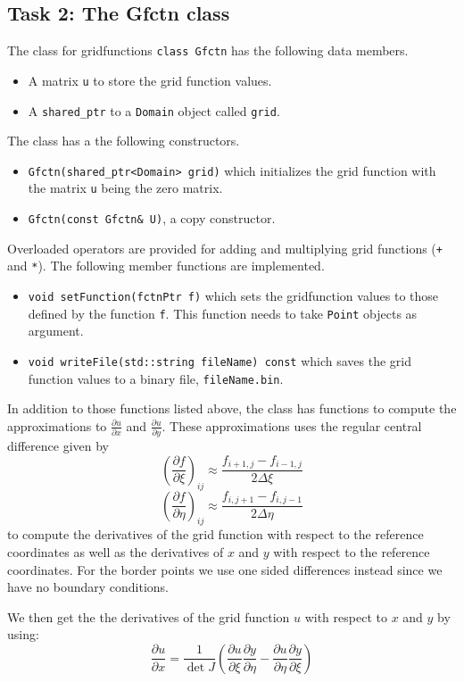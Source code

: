 \documentclass[a4paper,10pt]{article}
\begin{document}
\subsection*{Task 2: The Gfctn class}
The class for gridfunctions \texttt{class Gfctn} has the following data members.
\begin{itemize}
  \item
    A matrix \texttt{u} to store the grid function values.
  \item
    A \texttt{shared\_ptr} to a \texttt{Domain} object called \texttt{grid}.
\end{itemize}
The class has a the following constructors.
\begin{itemize}
  \item \texttt{Gfctn(shared\_ptr<Domain> grid)} which initializes the grid function with
    the matrix \texttt{u} being the zero matrix.
  \item \texttt{Gfctn(const Gfctn\& U)}, a copy constructor.
\end{itemize}
Overloaded operators are provided for adding and multiplying grid functions (\texttt{+} and 
\texttt{*}).
The following member functions are implemented.
\begin{itemize}
  \item
    \texttt{void setFunction(fctnPtr f)} which sets the gridfunction values to those
    defined by the function \texttt{f}. This function needs to take \texttt{Point}
    objects as argument.
  \item
    \texttt{void writeFile(std::string fileName) const} which saves the grid function
    values to a binary file, \texttt{fileName.bin}.
\end{itemize}
In addition to those functions listed above, the class has functions to compute 
the approximations to $\tfrac{\partial u}{\partial x}$ and $\tfrac{\partial u}{\partial y}$. These approximations uses the regular central difference given by
$$\left( \frac{\partial f}{\partial \xi} \right)_{ij} \approx \frac{f_{i+1,j}-f_{i-1,j}}{2 \Delta \xi} $$ 
$$\left(\frac{\partial f}{\partial \eta}\right)_{ij} \approx \frac{f_{i,j+1}-f_{i,j-1}}{2 \Delta \eta} $$ 
to compute the derivatives of the grid function with respect to the reference coordinates as well as the derivatives of $x$ and $y$ with respect to the reference coordinates. For the border points we use one sided differences instead since we have no boundary conditions.

We then get the the derivatives of the grid function $u$ with respect to $x$ and $y$ by using:
$$\frac{\partial u}{\partial x} = \frac{1}{\det J} \left(\frac{\partial u}{\partial \xi} \frac{\partial y}{\partial \eta} - \frac{\partial u}{\partial \eta} \frac{\partial y}{\partial \xi}  \right)$$
\end{document}
